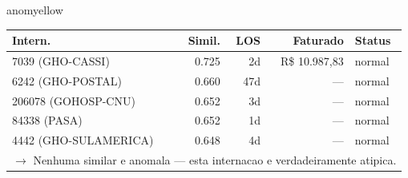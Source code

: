 \documentclass[a4paper,10pt]{article}
\begin{document}
\begin{anomalycard}[Internacao 119915 | GHO-BRADESCO | MODERADO (z=2.59)]{anomyellow}
\begin{tabular}{l r r r l}\toprule\textbf{Intern.} & \textbf{Simil.} & \textbf{LOS} & \textbf{Faturado} & \textbf{Status} \\\midrule
7039 (GHO-CASSI) & 0.725 & 2d & R\$ 10.987,83 & \textcolor{jcubeblue}{normal} \\
6242 (GHO-POSTAL) & 0.660 & 47d & --- & \textcolor{jcubeblue}{normal} \\
206078 (GOHOSP-CNU) & 0.652 & 3d & --- & \textcolor{jcubeblue}{normal} \\
84338 (PASA) & 0.652 & 1d & --- & \textcolor{jcubeblue}{normal} \\
4442 (GHO-SULAMERICA) & 0.648 & 4d & --- & \textcolor{jcubeblue}{normal} \\
\multicolumn{5}{l}{\textcolor{jcubeblue}{\small $\rightarrow$ Nenhuma similar e anomala --- esta internacao e verdadeiramente atipica.}} \\
\bottomrule\end{tabular}


\end{anomalycard}

\newpage
\end{document}
